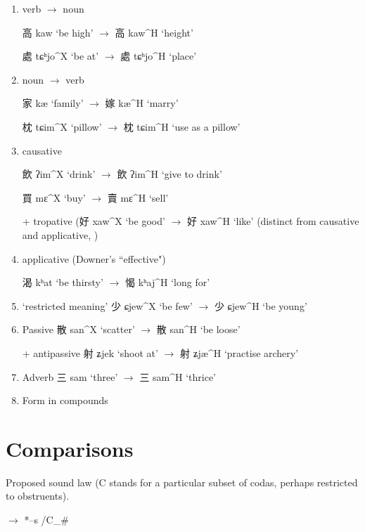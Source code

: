 \documentclass[oldfontcommands,oneside,a4paper,11pt]{article}
\newcommand{\ipa}[1]{{\phon \mbox{#1}}} %
\newcommand{\zh}[1]{{\cn #1}}
\newcommand{\ch}[3]{\zh{#1} \ipa{#2} `#3'}
\begin{document}
\begin{enumerate}
\item verb $\rightarrow$ noun 


\ch{高}{kaw}{be high} $\rightarrow$ \ch{高}{kaw^H}{height} 

\ch{處}{tɕʰjo^X}{be at} $\rightarrow$ \ch{處}{tɕʰjo^H}{place} 

\item noun $\rightarrow$ verb 

\ch{家}{kæ}{family} $\rightarrow$ \ch{嫁}{kæ^H}{marry} 

\ch{枕}{tɕim^X}{pillow} $\rightarrow$ \ch{枕}{tɕim^H}{use as a pillow} 

\item causative

\ch{飲}{ʔim^X}{drink} $\rightarrow$ \ch{飲}{ʔim^H}{give to drink} 

\ch{買}{mɛ^X}{buy} $\rightarrow$ \ch{賣}{mɛ^H}{sell} 


+ tropative (\ch{好}{xaw^X}{be good} $\rightarrow$ \ch{好}{xaw^H}{like} (distinct from causative and applicative, \citealt{jacques13tropative})
\item applicative (Downer's ``effective")

\ch{渴}{kʰat}{be thirsty} $\rightarrow$ \ch{愒}{kʰaj^H}{long for} 

\item `restricted meaning'
\ch{少}{ɕjew^X}{be few} $\rightarrow$ \ch{少}{ɕjew^H}{be young} 

\item Passive
\ch{散}{san^X}{scatter} $\rightarrow$ \ch{散}{san^H}{be loose} 

+ antipassive \ch{射}{ʑjek}{shoot at} $\rightarrow$ \ch{射}{ʑjæ^H}{practise archery} 

\item Adverb
\ch{三}{sam}{three} $\rightarrow$ \ch{三}{sam^H}{thrice} 

\item Form in compounds
\end{enumerate}

\section{Comparisons}
Proposed sound law (C stands for a particular subset of codas, perhaps restricted to obstruents).

\begin{exe}
\ex \label{ex:ts}
\glt *\ipa{--t} $\rightarrow$ *\ipa{--s} /C\_\# 
\end{exe}
\end{document}
